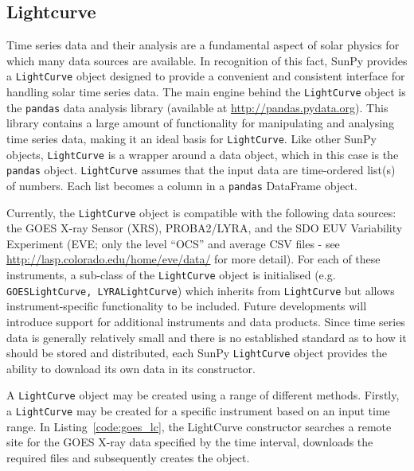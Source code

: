 \subsection{Lightcurve}\label{ssec:lightcurve}

Time series data and their analysis are a fundamental aspect of solar
physics for which many data sources are available.  In recognition of
this fact, SunPy provides a \texttt{LightCurve} object designed to
provide a convenient and consistent interface for handling solar time
series data.  The main engine behind the \texttt{LightCurve} object is
the \texttt{pandas} data analysis library (available at
\url{http://pandas.pydata.org}).  This library contains a large amount
of functionality for manipulating and analysing time series data,
making it an ideal basis for \texttt{LightCurve}.  Like other SunPy
objects, \texttt{LightCurve} is a wrapper around a data object, which
in this case is the \texttt{pandas} object.  \texttt{LightCurve}
assumes that the input data are time-ordered list(s) of numbers.  Each
list becomes a column in a \texttt{pandas} DataFrame object.

Currently, the \texttt{LightCurve} object is compatible with the
following data sources: the GOES X-ray Sensor (XRS), PROBA2/LYRA, and
the SDO EUV Variability Experiment (EVE; only the level ``OCS'' and
average CSV files - see \url{http://lasp.colorado.edu/home/eve/data/}
for more detail).  For each of these instruments, a sub-class of the
\texttt{LightCurve} object is initialised
(e.g. \texttt{GOESLightCurve, LYRALightCurve}) which inherits from
\texttt{LightCurve} but allows instrument-specific functionality to be
included.  Future developments will introduce support for additional
instruments and data products.  Since time series data is generally
relatively small and there is no established standard as to how it
should be stored and distributed, each SunPy \texttt{LightCurve}
object provides the ability to download its own data in its
constructor.


A \texttt{LightCurve} object may be created using a range of different methods. 
Firstly, a \texttt{LightCurve} may be created for a specific instrument based 
on an input time range. In Listing~\ref{code:goes_lc}, 
the LightCurve constructor searches a remote site for the GOES X-ray data 
specified by the time interval, downloads the required files and subsequently 
creates the object.

